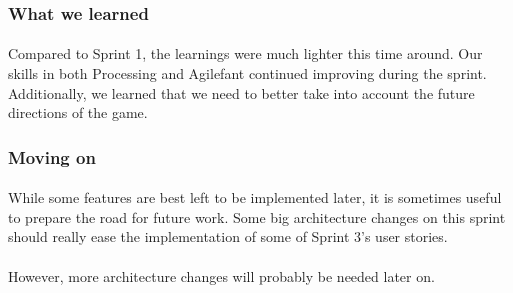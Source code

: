 \subsubsection{What we learned}

\paragraph{} Compared to Sprint 1, the learnings were much lighter this time around. Our skills in both Processing and Agilefant continued improving during the sprint. Additionally, we learned that we need to better take into account the future directions of the game.

\subsubsection{Moving on}

\paragraph{} While some features are best left to be implemented later, it is sometimes useful to prepare the road for future work. Some big architecture changes on this sprint should really ease the implementation of some of Sprint 3's user stories.

\paragraph{} However, more architecture changes will probably be needed later on.
